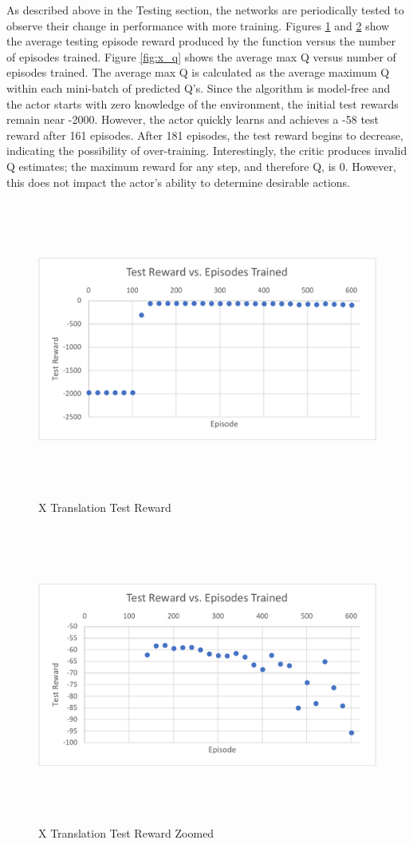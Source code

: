 As described above in the Testing section, the networks are periodically tested to observe their change in performance with more training. Figures \ref{fig:x_r} and \ref{fig:x_rzoom} show the average testing episode reward produced by the \mbox{} function versus the number of episodes trained. Figure \ref{fig:x_q} shows the average max Q versus number of episodes trained. The average max Q is calculated as the average maximum Q within each mini-batch of predicted Q's. Since the algorithm is model-free and the actor starts with zero knowledge of the environment, the initial test rewards remain near -2000. However, the actor quickly learns and achieves a -58 test reward after 161 episodes. After 181 episodes, the test reward begins to decrease, indicating the possibility of over-training. Interestingly, the critic produces invalid Q estimates; the maximum reward for any step, and therefore Q, is 0. However, this does not impact the actor's ability to determine desirable actions.
\begin{figure}[H]
	\centering
	\includegraphics[width=6in, height=3.85in, keepaspectratio]{figures/train_figs/x_r.pdf}
	\caption{X Translation Test Reward} \label{fig:x_r}
\end{figure}
\begin{figure}[H]
	\centering
	\includegraphics[width=6in, height=3.85in, keepaspectratio]{figures/train_figs/x_rzoom.pdf}
	\caption{X Translation Test Reward Zoomed} \label{fig:x_rzoom}
\end{figure}
